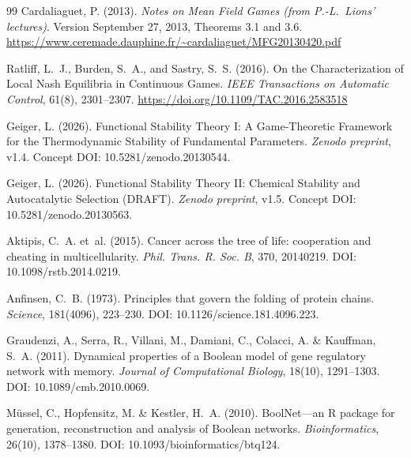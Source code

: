 \documentclass[12pt,a4paper]{article}
\theoremstyle{remark}
\begin{document}

\begin{thebibliography}{99}
Cardaliaguet, P. (2013).
\newblock \textit{Notes on Mean Field Games (from P.-L.\ Lions' lectures)}.
\newblock Version September 27, 2013, Theorems 3.1 and 3.6.
\newblock \url{https://www.ceremade.dauphine.fr/~cardaliaguet/MFG20130420.pdf}

Ratliff, L.~J., Burden, S.~A., and Sastry, S.~S. (2016).
\newblock On the Characterization of Local Nash Equilibria in Continuous Games.
\newblock \textit{IEEE Transactions on Automatic Control}, 61(8), 2301--2307.
\newblock \url{https://doi.org/10.1109/TAC.2016.2583518}



Geiger, L. (2026).
\newblock Functional Stability Theory I: A Game-Theoretic Framework for the Thermodynamic Stability of Fundamental Parameters.
\newblock \textit{Zenodo preprint}, v1.4.
\newblock Concept DOI: 10.5281/zenodo.20130544.

Geiger, L. (2026).
\newblock Functional Stability Theory II: Chemical Stability and Autocatalytic Selection (DRAFT).
\newblock \textit{Zenodo preprint}, v1.5.
\newblock Concept DOI: 10.5281/zenodo.20130563.

Aktipis, C.~A. et~al. (2015).
\newblock Cancer across the tree of life: cooperation and cheating in multicellularity.
\newblock \textit{Phil. Trans. R. Soc. B}, 370, 20140219.
\newblock DOI: 10.1098/rstb.2014.0219.

Anfinsen, C.~B. (1973).
\newblock Principles that govern the folding of protein chains.
\newblock \textit{Science}, 181(4096), 223--230.
\newblock DOI: 10.1126/science.181.4096.223.

Graudenzi, A., Serra, R., Villani, M., Damiani, C., Colacci, A. \& Kauffman, S.~A. (2011).
\newblock Dynamical properties of a Boolean model of gene regulatory network with memory.
\newblock \textit{Journal of Computational Biology}, 18(10), 1291--1303.
\newblock DOI: 10.1089/cmb.2010.0069.

M{\"u}ssel, C., Hopfensitz, M. \& Kestler, H.~A. (2010).
\newblock BoolNet---an R package for generation, reconstruction and analysis of Boolean networks.
\newblock \textit{Bioinformatics}, 26(10), 1378--1380.
\newblock DOI: 10.1093/bioinformatics/btq124.


\end{thebibliography}
\end{document}
